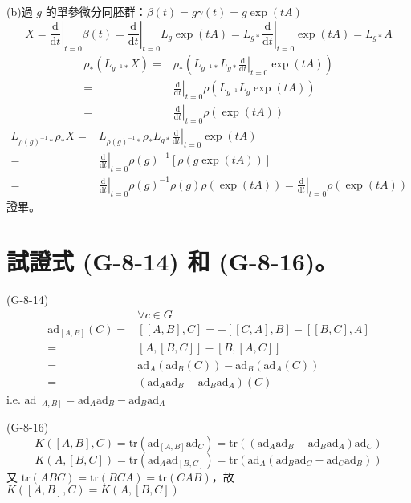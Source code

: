 \documentclass{article}
\begin{document}
\begin{framed}
  (b)過 $g$ 的單參微分同胚群：$\beta(t)=g\gamma(t)=g\exp(tA)$
  $$
    X=\left.\frac{\mathrm{d}}{\mathrm{d}t}\right|_{t=0}\beta(t)=\left.\frac{\mathrm{d}}{\mathrm{d}t}\right|_{t=0}L_g\exp(tA)=L_{g*}\left.\frac{\mathrm{d}}{\mathrm{d}t}\right|_{t=0}\exp(tA)=L_{g*}A
  $$
  $$\begin{aligned}
      \rho_*(L_{g^{-1}*}X)= & \rho_*\left(L_{g^{-1}*}L_{g*}\left.\frac{\mathrm{d}}{\mathrm{d}t}\right|_{t=0}\exp(tA)\right) \\
      =                     & \left.\frac{\mathrm{d}}{\mathrm{d}t}\right|_{t=0}\rho\left(L_{g^{-1}}L_{g}\exp(tA)\right)     \\
      =                     & \left.\frac{\mathrm{d}}{\mathrm{d}t}\right|_{t=0}\rho\left(\exp(tA)\right)
    \end{aligned}
  $$
  $$\begin{aligned}
      L_{\rho(g)^{-1}*}\rho_*X= & L_{\rho(g)^{-1}*}\rho_*L_{g*}\left.\frac{\mathrm{d}}{\mathrm{d}t}\right|_{t=0}\exp(tA)                                                                        \\
      =                         & \left.\frac{\mathrm{d}}{\mathrm{d}t}\right|_{t=0}\rho(g)^{-1}\left[\rho(g\exp(tA))\right]                                                                     \\
      =                         & \left.\frac{\mathrm{d}}{\mathrm{d}t}\right|_{t=0}\rho(g)^{-1}\rho(g)\rho(\exp(tA))=\left.\frac{\mathrm{d}}{\mathrm{d}t}\right|_{t=0}\rho\left(\exp(tA)\right)
    \end{aligned}
  $$
  證畢。
\end{framed}

\section{試證式 (G-8-14) 和 (G-8-16)。}
\begin{framed}
  (G-8-14)
  $$\begin{aligned}
                              & \forall c\in G                                                  \\
      \mathrm{ad}_{[A,B]}(C)= & [[A,B],C]=-[[C,A],B]-[[B,C],A]                                  \\
      =                       & [A,[B,C]]-[B,[A,C]]                                             \\
      =                       & \mathrm{ad}_A(\mathrm{ad}_B(C))-\mathrm{ad}_B(\mathrm{ad}_A(C)) \\
      =                       & (\mathrm{ad}_A\mathrm{ad}_B-\mathrm{ad}_B\mathrm{ad}_A)(C)
    \end{aligned}
  $$
  i.e. $\mathrm{ad}_{[A,B]}=\mathrm{ad}_A\mathrm{ad}_B-\mathrm{ad}_B\mathrm{ad}_A$

  (G-8-16)
  $$
    K([A,B],C)=\mathrm{tr}(\mathrm{ad}_{[A,B]}\mathrm{ad}_C)=\mathrm{tr}((\mathrm{ad}_A\mathrm{ad}_B-\mathrm{ad}_B\mathrm{ad}_A)\mathrm{ad}_C)
  $$
  $$
    K(A,[B,C])=\mathrm{tr}(\mathrm{ad}_{A}\mathrm{ad}_{[B,C]})=\mathrm{tr}(\mathrm{ad}_A(\mathrm{ad}_B\mathrm{ad}_C-\mathrm{ad}_C\mathrm{ad}_B))
  $$
  又 $\mathrm{tr}(ABC)=\mathrm{tr}(BCA)=\mathrm{tr}(CAB)$，故 $K([A,B],C)=K(A,[B,C])$
\end{framed}
\end{document}
